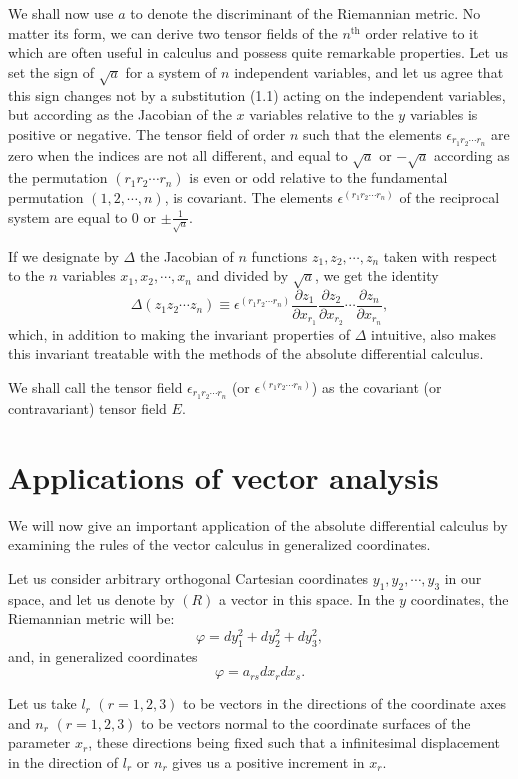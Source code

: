 \documentclass{book}
\begin{document}
We shall now use $a$ to denote the discriminant of the Riemannian metric. No matter its form, we can derive two tensor fields of the $n^{\text{th}}$ order relative to it which are often useful in calculus and possess quite remarkable properties. Let us set the sign of $\sqrt{a}$ for a system of $n$ independent variables, and let us agree that this sign changes not by a substitution (1.1) acting on the independent variables, but according as the Jacobian of the $x$ variables relative to the $y$ variables is positive or negative. The tensor field of order $n$ such that the elements $\epsilon_{r_1r_2\cdots r_n}$ are zero when the indices are not all different, and equal to $\sqrt{a}$ or $-\sqrt{a}$ according as the permutation $(r_1r_2\cdots r_n)$ is even or odd relative to the fundamental permutation $(1,2,\cdots,n)$, is covariant. The elements $\epsilon^{(r_1r_2\cdots r_n)}$ of the reciprocal system are equal to $0$ or $\pm\frac{1}{\sqrt{a}}$.

If we designate by $\Delta$ the Jacobian of $n$ functions $z_1,z_2,\cdots,z_n$ taken with respect to the $n$ variables $x_1,x_2,\cdots,x_n$ and divided by $\sqrt{a}$, we get the identity
$$\Delta(z_1z_2\cdots z_n)\equiv\epsilon^{(r_1r_2\cdots r_n)}\frac{\partial z_1}{\partial x_{r_1}}\frac{\partial z_2}{\partial x_{r_2}}\cdots\frac{\partial z_n}{\partial x_{r_n}},$$
which, in addition to making the invariant properties of $\Delta$ intuitive, also makes this invariant treatable with the methods of the absolute differential calculus. 

We shall call the tensor field $\epsilon_{r_1r_2\cdots r_n}$ (or $\epsilon^{(r_1r_2\cdots r_n)}$) as the covariant (or contravariant) tensor field $E$.

\section{Applications of vector analysis}

We will now give an important application of the absolute differential calculus by examining the rules of the vector calculus in generalized coordinates. 

Let us consider arbitrary orthogonal Cartesian coordinates $y_1,y_2,\cdots,y_3$ in our space, and let us denote by $(R)$ a vector in this space. In the $y$ coordinates, the Riemannian metric will be:
$$\varphi=dy_1^2+dy_2^2+dy_3^2,$$
and, in generalized coordinates
$$\varphi=a_{rs}dx_rdx_s.$$

Let us take $l_r$ $(r=1,2,3)$ to be vectors in the directions of the coordinate axes and $n_r$ $(r=1,2,3)$ to be vectors normal to the coordinate surfaces of the parameter $x_r$, these directions being fixed such that a infinitesimal displacement in the direction of $l_r$ or $n_r$ gives us a positive increment in $x_r$.
\end{document}
